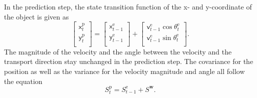 In the prediction step, the state transition function of the x- and y-coordinate of the object is given as
\begin{equation}
    \begin{bmatrix}
    \mathsf{x}_{t}^{\mathrm{p}}\\
    \mathsf{y}_{t}^{\mathrm{p}}\\
    \end{bmatrix}
    =
    \begin{bmatrix}
    \mathsf{x}_{t-1}^{\mathrm{e}}\\
    \mathsf{y}_{t-1}^{\mathrm{e}}\\
    \end{bmatrix}
    +
    \begin{bmatrix}
    \mathsf{v}_{t-1}^{\mathrm{e}}\cos\theta_{t}^{\mathrm{e}}\\
    \mathsf{v}_{t-1}^{\mathrm{e}}\sin\theta_{t}^{\mathrm{e}}\\
    \end{bmatrix}.
\end{equation}
The magnitude of the velocity and the angle between the velocity and the transport direction stay unchanged in the prediction step. The covariance for the position as well as the variance for the velocity magnitude and angle all follow the equation
\begin{equation}
    S_{t}^{\mathrm{p}}=S_{t-1}^{\mathrm{e}}+S^{\boldsymbol{w}}.
\end{equation}
